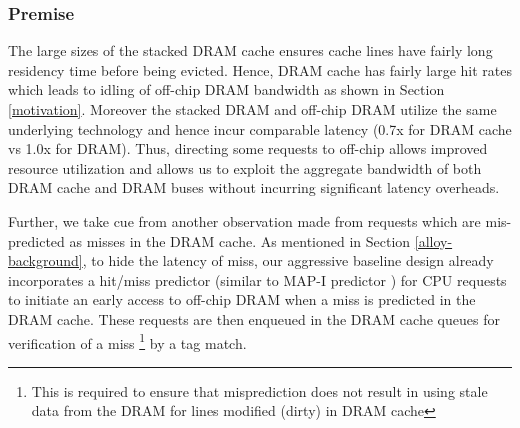 \subsubsection{Premise}
The large sizes of the stacked DRAM cache ensures cache lines have fairly long residency time before being evicted. Hence, DRAM cache has fairly large hit rates which leads to idling of off-chip DRAM bandwidth as shown in Section \ref{motivation}. Moreover the stacked DRAM and off-chip DRAM utilize the same underlying technology and hence incur comparable latency (0.7x for DRAM cache vs 1.0x for DRAM). Thus, directing some requests to off-chip allows improved resource utilization and allows us to exploit the aggregate bandwidth of both DRAM cache and DRAM buses without incurring significant latency overheads.
\par Further, we take cue from another observation made from requests which are mis-predicted as misses in the DRAM cache. As mentioned in Section \ref{alloy-background}, to hide the latency of miss, our aggressive baseline design already incorporates a hit/miss predictor (similar to MAP-I predictor \cite{alloy}) for CPU requests to initiate an early access to off-chip DRAM when a miss is predicted in the DRAM cache. These requests are then enqueued in the DRAM cache queues for verification of a miss 
\footnote{This is required to ensure that misprediction does not result in using stale data from the DRAM for lines modified (dirty) in DRAM cache}
by a tag match. 

